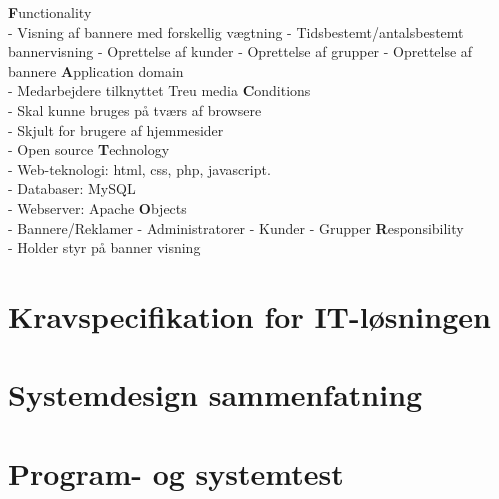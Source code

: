 \documentclass[a4paper,12pt]{article}
\begin{document}
\large{\bf{F}}\normalsize{unctionality
\\
- Visning af bannere med forskellig vægtning
\newline
- Tidsbestemt/antalsbestemt bannervisning 
\newline
- Oprettelse af kunder 
\newline
- Oprettelse af grupper
\newline
- Oprettelse af bannere}
\newline
\newline
\large{\bf{A}}\normalsize{pplication domain
\\
- Medarbejdere tilknyttet Treu media}
\newline
\newline
\large{\bf{C}}\normalsize{onditions\\
- Skal kunne bruges på tværs af browsere\\
- Skjult for brugere af hjemmesider\\
- Open source}
\newline
\newline
\large{\bf{T}}\normalsize{echnology\\
- Web-teknologi: html, css, php, javascript.\\
- Databaser: MySQL\\
- Webserver: Apache}
\newline
\newline
\large{\bf{O}}\normalsize{bjects\\
- Bannere/Reklamer
\newline
- Administratorer
\newline
- Kunder
\newline
- Grupper}
\newline
\newline
\large{\bf{R}}\normalsize{esponsibility\\
- Holder styr på banner visning}

\section{Kravspecifikation for IT-løsningen}

\section{Systemdesign sammenfatning}

\section{Program- og systemtest}
\end{document}
